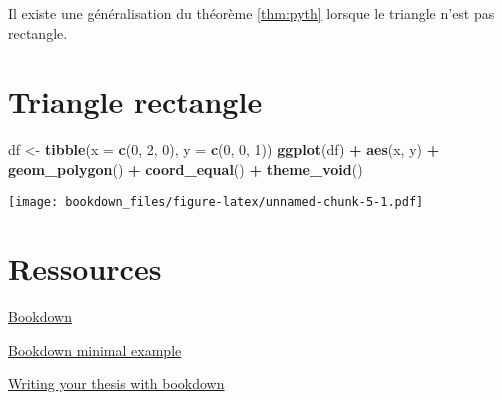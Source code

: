 \documentclass[]{book}
\newenvironment{Shaded}{\begin{snugshade}}{\end{snugshade}}
\newcommand{\DataTypeTok}[1]{\textcolor[rgb]{0.13,0.29,0.53}{#1}}
\newcommand{\DecValTok}[1]{\textcolor[rgb]{0.00,0.00,0.81}{#1}}
\newcommand{\KeywordTok}[1]{\textcolor[rgb]{0.13,0.29,0.53}{\textbf{#1}}}
\newcommand{\NormalTok}[1]{#1}
\newcommand{\OperatorTok}[1]{\textcolor[rgb]{0.81,0.36,0.00}{\textbf{#1}}}
\newcommand{\StringTok}[1]{\textcolor[rgb]{0.31,0.60,0.02}{#1}}
\theoremstyle{definition}
\theoremstyle{definition}
\theoremstyle{definition}
\theoremstyle{remark}
\let\BeginKnitrBlock\begin \let\EndKnitrBlock\end
\begin{document}
\BeginKnitrBlock{remark}[Al-Kashi]
\iffalse{} {Remark (Al-Kashi). } \fi{}Il existe une généralisation du théorème \ref{thm:pyth} lorsque le triangle n'est pas rectangle.
\EndKnitrBlock{remark}

\hypertarget{appendix-appendices}{%
\appendix}


\hypertarget{triangle-rectangle}{%
\chapter{Triangle rectangle}\label{triangle-rectangle}}

\begin{Shaded}
\begin{Highlighting}[]
\NormalTok{df <-}\StringTok{ }\KeywordTok{tibble}\NormalTok{(}\DataTypeTok{x =} \KeywordTok{c}\NormalTok{(}\DecValTok{0}\NormalTok{, }\DecValTok{2}\NormalTok{, }\DecValTok{0}\NormalTok{), }\DataTypeTok{y =} \KeywordTok{c}\NormalTok{(}\DecValTok{0}\NormalTok{, }\DecValTok{0}\NormalTok{, }\DecValTok{1}\NormalTok{))}
\KeywordTok{ggplot}\NormalTok{(df) }\OperatorTok{+}
\StringTok{  }\KeywordTok{aes}\NormalTok{(x, y) }\OperatorTok{+}
\StringTok{  }\KeywordTok{geom_polygon}\NormalTok{() }\OperatorTok{+}
\StringTok{  }\KeywordTok{coord_equal}\NormalTok{() }\OperatorTok{+}
\StringTok{  }\KeywordTok{theme_void}\NormalTok{() }
\end{Highlighting}
\end{Shaded}

\texttt{[image: bookdown\_files/figure-latex/unnamed-chunk-5-1.pdf]}

\hypertarget{ressources}{%
\chapter{Ressources}\label{ressources}}

\href{https://bookdown.org/yihui/bookdown/}{Bookdown}

\href{https://bookdown.org/yihui/bookdown-demo/}{Bookdown minimal example}

\href{https://eddjberry.netlify.com/post/writing-your-thesis-with-bookdown/}{Writing your thesis with bookdown}


\end{document}
